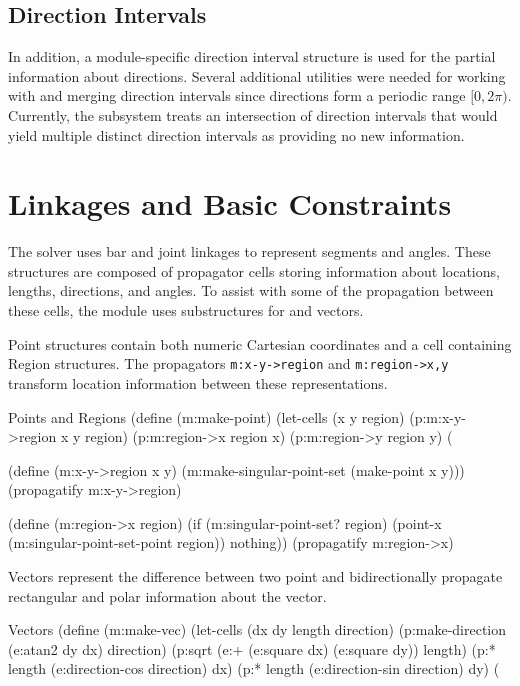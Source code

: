 \subsection{Direction Intervals}

In addition, a module-specific direction interval structure is used
for the partial information about directions. Several additional
utilities were needed for working with and merging direction intervals
since directions form a periodic range $[0,2\pi)$. Currently, the
  subsystem treats an intersection of direction intervals that would
  yield multiple distinct direction intervals as providing no
  new information.

\section{Linkages and Basic Constraints}

The solver uses bar and joint linkages to represent segments and
angles. These structures are composed of propagator cells storing
information about locations, lengths, directions, and angles. To
assist with some of the propagation between these cells, the module
uses substructures for and vectors.

Point structures contain both numeric Cartesian coordinates and a cell
containing Region structures. The propagators \texttt{m:x-y->region}
and \texttt{m:region->x,y} transform location information between
these representations.

\begin{code-listing}
[label=point-region]
{Points and Regions}
(define (m:make-point)
  (let-cells (x y region)
    (p:m:x-y->region x y region)
    (p:m:region->x region x)
    (p:m:region->y region y)
    (%

(define (m:x-y->region x y)
  (m:make-singular-point-set (make-point x y)))
(propagatify m:x-y->region)

(define (m:region->x region)
  (if (m:singular-point-set? region)
      (point-x (m:singular-point-set-point region))
      nothing))
(propagatify m:region->x)
\end{code-listing}

Vectors represent the difference between two point and bidirectionally
propagate rectangular and polar information about the vector.

\begin{code-listing}
[label=vec-struct]
{Vectors}
(define (m:make-vec)
  (let-cells (dx dy length direction)
    (p:make-direction (e:atan2 dy dx) direction)
    (p:sqrt (e:+ (e:square dx)
                 (e:square dy))
            length)
    (p:* length (e:direction-cos direction) dx)
    (p:* length (e:direction-sin direction) dy)
    (%
\end{code-listing}

